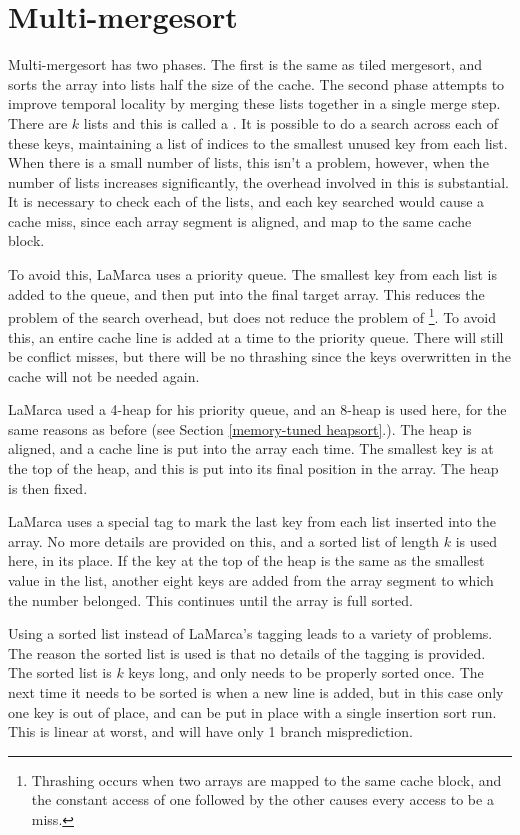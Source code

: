 \section{Multi-mergesort}

Multi-mergesort has two phases. The first is the same as tiled mergesort, and
sorts the array into lists half the size of the cache. The second phase attempts
to improve temporal locality by merging these lists together in a single merge
step. There are $k$ lists and this is called a . It is possible
to do a search across each of these keys, maintaining a list of indices to the
smallest unused key from each list. When there is a small number of lists, this
isn't a problem, however, when the number of lists increases significantly, the
overhead involved in this is substantial. It is necessary to check each of the
lists, and each key searched would cause a cache miss, since each array segment
is aligned, and map to the same cache block.

To avoid this, LaMarca uses a priority queue. The smallest key from each list is
added to the queue, and then put into the final target array. This reduces the
problem of the search overhead, but does not reduce the problem of
\footnote{Thrashing occurs when two arrays are mapped to the same
cache block, and the constant access of one followed by the other causes every
access to be a miss.}. To avoid this, an entire cache line is added at a time to
the priority queue. There will still be conflict misses, but there will be no
thrashing since the keys overwritten in the cache will not be needed again.

LaMarca used a 4-heap for his priority queue, and an 8-heap is used here, for
the same reasons as before (see Section \ref{memory-tuned heapsort}.). The heap
is aligned, and a cache line is put into the array each time. The smallest key
is at the top of the heap, and this is put into its final position in the array.
The heap is then fixed.

LaMarca uses a special tag to mark the last key from each list inserted into
the array. No more details are provided on this, and a sorted list of length $k$
is used here, in its place. If the key at the top of the heap is the same as the
smallest value in the list, another eight keys are added from the array segment
to which the number belonged. This continues until the array is full sorted.

Using a sorted list instead of LaMarca's tagging leads to a variety of problems.
The reason the sorted list is used is that no details of the tagging is
provided. The sorted list is $k$ keys long, and only needs to be properly sorted
once. The next time it needs to be sorted is when a new line is added, but in
this case only one key is out of place, and can be put in place with a single
insertion sort run. This is linear at worst, and will have only 1 branch
misprediction.

